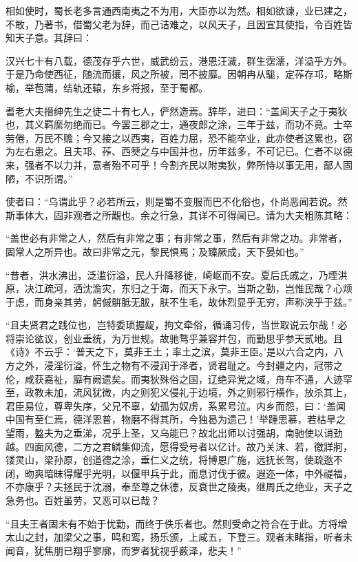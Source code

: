 \documentclass[]{article}
\begin{document}
相如使时，蜀长老多言通西南夷之不为用，大臣亦以为然。相如欲谏，业已建之，不敢，乃著书，借蜀父老为辞，而己诘难之，以风天子，且因宣其使指，令百姓皆知天子意。其辞曰：

汉兴七十有八载，德茂存乎六世，威武纷云，港恩汪濊，群生霑濡，洋溢乎方外。于是乃命使西征，随流而攘，风之所被，罔不披靡。因朝冉从駹，定莋存邛，略斯榆，举苞蒲，结轨还辕，东乡将报，至于蜀都。

耆老大夫搢绅先生之徒二十有七人，俨然造焉。辞毕，进曰：``盖闻天子之于夷狄也，其义羁縻勿绝而已。今罢三郡之士，通夜郎之涂，三年于兹，而功不竟。士卒劳倦，万民不赡；今又接之以西夷，百姓力屈，恐不能卒业，此亦使者这累也，窃为左右患之。且夫邛、莋、西僰之与中国并也，历年兹多，不可记已。仁者不以德来，强者不以力并，意者殆不可乎！今割齐民以附夷狄，弊所恃以事无用，鄙人固陋，不识所谓。''

使者曰：``乌谓此乎？必若所云，则是蜀不变服而巴不化俗也，仆尚恶闻若说。然斯事体大，固非观者之所覯也。余之行急，其详不可得闻已。请为大夫粗陈其略：

``盖世必有非常之人，然后有非常之事；有非常之事，然后有非常之功。非常者，固常人之所异也。故曰非常之元，黎民惧焉；及臻厥成，天下晏如也。''

``昔者，洪水沸出，泛滥衍溢，民人升降移徙，崎岖而不安。夏后氏戚之，乃堙洪原，决江疏河，洒沈澹灾，东归之于海，而天下永宁。当斯之勤，岂惟民哉？心烦于虑，而身亲其劳，躬傶骿胝无胈，肤不生毛，故休烈显乎无穷，声称浃乎于兹。''

``且夫贤君之践位也，岂特委琐握龊，拘文牵俗，循诵习传，当世取说云尔哉！必将崇论谹议，创业垂统，为万世规。故驰骛乎兼容并包，而勤思乎参天贰地。且《诗》不云乎：`普天之下，莫非王土；率土之滨，莫非王臣。'是以六合之内，八方之外，浸淫衍溢，怀生之物有不浸润于泽者，贤君耻之。今封疆之内，冠带之伦，咸获嘉祉，靡有阙遗矣。而夷狄殊俗之国，辽绝异党之域，舟车不通，人迹罕至，政教未加，流风犹微，内之则犯义侵礼于边境，外之则邪行横作，放杀其上，君臣易位，尊卑失序，父兄不辜，幼孤为奴虏，系累号泣。内乡而怨，曰：`盖闻中国有至仁焉，德洋恩普，物磨不得其所，今独曷为遗己！'举踵思慕，若枯旱之望雨，盭夫为之垂涕，况乎上圣，又乌能已？故北出师以讨强胡，南驰使以诮劲越。四面风德，二方之君鳞集仰流，愿得受号者以亿计。故乃关沫、若，徼牂牁，镂灵山，梁孙原，创道德之涂，垂仁义之统，将博恩广施，远抚长驾，使疏逖不闭，昒爽暗昧得耀乎光明，以偃甲兵于此，而息讨伐于彼。遐迩一体，中外禔福，不亦康乎？夫拯民于沈溺，奉至尊之休德，反衰世之陵夷，继周氏之绝业，天子之急务也。百姓虽劳，又恶可以已哉？

``且夫王者固未有不始于忧勤，而终于佚乐者也。然则受命之符合在于此。方将增太山之封，加梁父之事，鸣和鸾，扬乐颁，上咸五，下登三。观者未睹指，听者未闻音，犹焦朋已翔乎寥廓，而罗者犹视乎薮泽，悲夫！''
\end{document}
